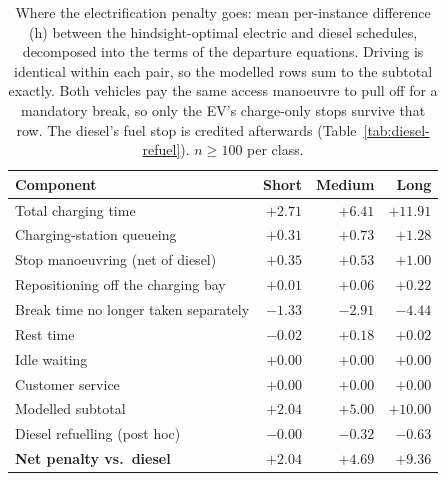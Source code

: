 \begin{table}[ht]\centering
\caption{Where the electrification penalty goes: mean per-instance difference (h) between the hindsight-optimal electric and diesel schedules, decomposed into the terms of the departure equations. Driving is identical within each pair, so the modelled rows sum to the subtotal exactly. Both vehicles pay the same access manoeuvre to pull off for a mandatory break, so only the EV's charge-only stops survive that row. The diesel's fuel stop is credited afterwards (Table~\ref{tab:diesel-refuel}). $n \geq 100$ per class.}
\label{tab:diesel-decomp}
\begin{tabular}{lrrr}
\hline
Component & Short & Medium & Long \\
\hline
Total charging time & $+2.71$ & $+6.41$ & $+11.91$ \\
Charging-station queueing & $+0.31$ & $+0.73$ & $+1.28$ \\
Stop manoeuvring (net of diesel) & $+0.35$ & $+0.53$ & $+1.00$ \\
Repositioning off the charging bay & $+0.01$ & $+0.06$ & $+0.22$ \\
Break time no longer taken separately & $-1.33$ & $-2.91$ & $-4.44$ \\
Rest time & $-0.02$ & $+0.18$ & $+0.02$ \\
Idle waiting & $+0.00$ & $+0.00$ & $+0.00$ \\
Customer service & $+0.00$ & $+0.00$ & $+0.00$ \\
\hline
Modelled subtotal & $+2.04$ & $+5.00$ & $+10.00$ \\
Diesel refuelling (post hoc) & $-0.00$ & $-0.32$ & $-0.63$ \\
\hline
\textbf{Net penalty vs.\ diesel} & $\mathbf{+2.04}$ & $\mathbf{+4.69}$ & $\mathbf{+9.36}$ \\
\hline
\end{tabular}
\end{table}
